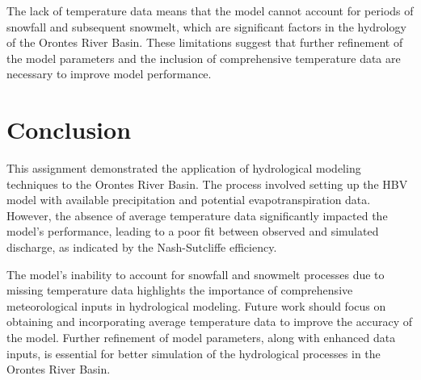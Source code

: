 \documentclass[a4paper, 12pt]{article}
\begin{document}
The lack of temperature data means that the model cannot account for periods of snowfall and subsequent snowmelt, which are significant factors in the hydrology of the Orontes River Basin. These limitations suggest that further refinement of the model parameters and the inclusion of comprehensive temperature data are necessary to improve model performance.

\section{Conclusion}
This assignment demonstrated the application of hydrological modeling techniques to the Orontes River Basin. The process involved setting up the HBV model with available precipitation and potential evapotranspiration data. However, the absence of average temperature data significantly impacted the model's performance, leading to a poor fit between observed and simulated discharge, as indicated by the Nash-Sutcliffe efficiency.

The model's inability to account for snowfall and snowmelt processes due to missing temperature data highlights the importance of comprehensive meteorological inputs in hydrological modeling. Future work should focus on obtaining and incorporating average temperature data to improve the accuracy of the model. Further refinement of model parameters, along with enhanced data inputs, is essential for better simulation of the hydrological processes in the Orontes River Basin.



\cite{booij2005impact}
\end{document}
